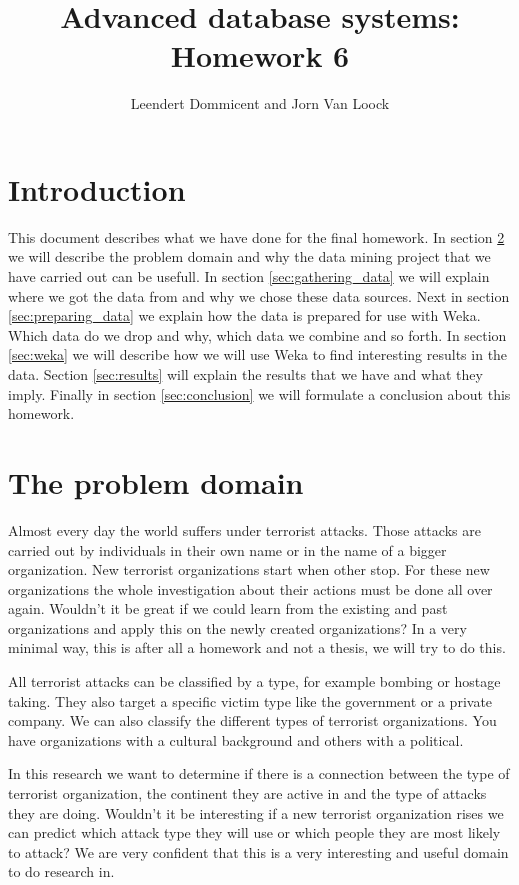 \documentclass[a4]{article}
\title{Advanced database systems: Homework 6}
\author{Leendert Dommicent and Jorn Van Loock}
\date{}
\begin{document}
\maketitle
\setlength{\parindent}{0px}
\setlength{\parskip}{8px}
\section{Introduction}
This document describes what we have done for the final homework. In section \ref{sec:problem} we will describe the problem domain and why the data mining project that we have carried out can be usefull. In section \ref{sec:gathering_data} we will explain where we got the data from and why we chose these data sources. Next in section \ref{sec:preparing_data} we explain how the data is prepared for use with Weka. Which data do we drop and why, which data we combine and so forth. In section \ref{sec:weka} we will describe how we will use Weka to find interesting results in the data. Section \ref{sec:results} will explain the results that we have and what they imply. Finally in section \ref{sec:conclusion} we will formulate a conclusion about this homework.
\section{The problem domain}
\label{sec:problem}
Almost every day the world suffers under terrorist attacks. Those attacks are carried out by individuals in their own name or in the name of a bigger organization. New terrorist organizations start when other stop. For these new organizations the whole investigation about their actions must be done all over again. Wouldn't it be great if we could learn from the existing and past organizations and apply this on the newly created organizations? In a very minimal way, this is after all a homework and not a thesis, we will try to do this.\par
All terrorist attacks can be classified by a type, for example bombing or hostage taking. They also target a specific victim type like the government or a private company. We can also classify the different types of terrorist organizations. You have organizations with a cultural background and others with a political.\par
In this research we want to determine if there is a connection between the type of terrorist organization, the continent they are active in and the type of attacks they are doing. Wouldn't it be interesting if a new terrorist organization rises we can predict which attack type they will use or which people they are most likely to attack? We are very confident that this is a very interesting and useful domain to do research in.
\end{document}
